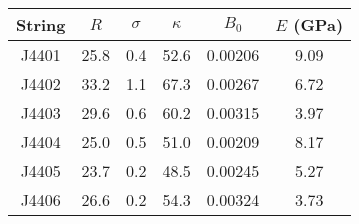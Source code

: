 \begin{tabular}{cccccc}
\toprule
String & $R$ & $\sigma$ & $\kappa$ & $B_0$ & $E$ (GPa) \\
\midrule
J4401 & 25.8 & 0.4 & 52.6 & 0.00206 & 9.09 \\
J4402 & 33.2 & 1.1 & 67.3 & 0.00267 & 6.72 \\
J4403 & 29.6 & 0.6 & 60.2 & 0.00315 & 3.97 \\
J4404 & 25.0 & 0.5 & 51.0 & 0.00209 & 8.17 \\
J4405 & 23.7 & 0.2 & 48.5 & 0.00245 & 5.27 \\
J4406 & 26.6 & 0.2 & 54.3 & 0.00324 & 3.73 \\
\bottomrule
\end{tabular}


